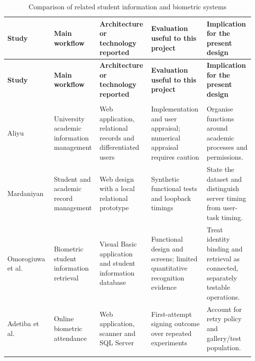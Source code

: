 \begingroup
\singlespacing%
\setlength{\tabcolsep}{4pt}
\begin{landscape}
\begin{longtable}{@{}>{\RaggedRight\arraybackslash}p{}>{\RaggedRight\arraybackslash}p{}>{\RaggedRight\arraybackslash}p{}>{\RaggedRight\arraybackslash}p{}>{\RaggedRight\arraybackslash}p{}@{}}
\caption{Comparison of related student information and biometric systems}\label{tab:2-1}\\
\toprule
\textbf{Study} & \textbf{Main workflow} & \textbf{Architecture or technology reported} & \textbf{Evaluation useful to this project} & \textbf{Implication for the present design} \\
\midrule
\endfirsthead%
\toprule
\textbf{Study} & \textbf{Main workflow} & \textbf{Architecture or technology reported} & \textbf{Evaluation useful to this project} & \textbf{Implication for the present design} \\
\midrule
\endhead%
\midrule
\multicolumn{5}{r}{Continued on next page}\\
\endfoot%
\bottomrule
\endlastfoot%
Aliyu~\cite{aliyu2015} & University academic information management & Web application, relational records and differentiated users & Implementation and user appraisal; numerical appraisal requires caution & Organise functions around academic processes and permissions. \\ \addlinespace
Mardaniyan~\cite{mardaniyan2019} & Student and academic record management & Web design with a local relational prototype & Synthetic functional tests and loopback timings & State the dataset and distinguish server timing from user-task timing. \\ \addlinespace
Omorogiuwa et al.~\cite{omorogiuwa2023} & Biometric student information retrieval & Visual Basic application and student information database & Functional design and screens; limited quantitative recognition evidence & Treat identity binding and retrieval as connected, separately testable operations. \\ \addlinespace
Adetiba et al.~\cite{adetiba2013} & Online biometric attendance & Web application, scanner and SQL Server & First-attempt signing outcome over repeated experiments & Account for retry policy and gallery/test population. \\ \addlinespace

\end{longtable}
\end{landscape}
